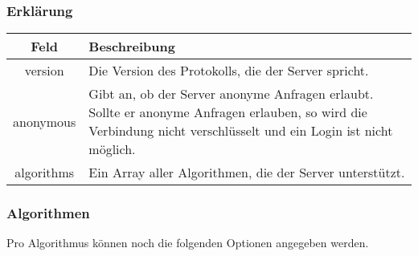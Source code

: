 \documentclass[ngerman,titlepage]{scrartcl}
\begin{document}
    \subsubsection*{Erklärung}
    
    \begin{tabular}{|c|p{14cm}|}
    	\hline
    	\textbf{Feld} & \textbf{Beschreibung} \\ 
    	\hline \hline
    	
    	version & Die Version des Protokolls, die der Server spricht. \\ 
    	\hline
    	
    	anonymous & Gibt an, ob der Server anonyme Anfragen erlaubt. Sollte er anonyme Anfragen erlauben, so wird die Verbindung nicht verschlüsselt und ein Login ist nicht möglich. \\
    	\hline
    	
    	algorithms & Ein Array aller Algorithmen, die der Server unterstützt. \\
    	\hline
    \end{tabular}
    
    \subsubsection*{Algorithmen}
    
    Pro Algorithmus können noch die folgenden Optionen angegeben werden.
    
\end{document}
